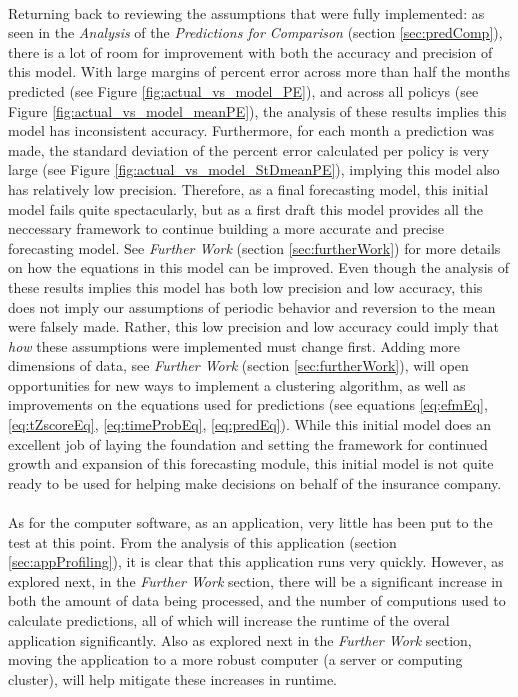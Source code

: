 \documentclass[12pt,letterpaper,titlepage]{article}
\begin{document}
		\paragraph*{}Returning back to reviewing the assumptions that were fully implemented: as seen in the \emph{Analysis} of the \emph{Predictions for Comparison} (section \ref{sec:predComp}), there is a lot of room for improvement with both the accuracy and precision of this model. With large margins of percent error across more than half the months predicted (see Figure \ref{fig:actual_vs_model_PE}), and across all policys (see Figure \ref{fig:actual_vs_model_meanPE}), the analysis of these results implies this model has inconsistent accuracy. Furthermore, for each month a prediction was made, the standard deviation of the percent error calculated per policy is very large (see Figure \ref{fig:actual_vs_model_StDmeanPE}), implying this model also has relatively low precision. Therefore, as a final forecasting model, this initial model fails quite spectacularly, but as a first draft this model provides all the neccessary framework to continue building a more accurate and precise forecasting model. See \emph{Further Work} (section \ref{sec:furtherWork}) for more details on how the equations in this model can be improved. Even though the analysis of these results implies this model has both low precision and low accuracy, this does not imply our assumptions of periodic behavior and reversion to the mean were falsely made. Rather, this low precision and low accuracy could imply that \emph{how} these assumptions were implemented must change first. Adding more dimensions of data, see \emph{Further Work} (section \ref{sec:furtherWork}), will open opportunities for new ways to implement a clustering algorithm, as well as improvements on the equations used for predictions (see equations \ref{eq:efmEq}, \ref{eq:tZscoreEq}, \ref{eq:timeProbEq}, \ref{eq:predEq}). While this initial model does an excellent job of laying the foundation and setting the framework for continued growth and expansion of this forecasting module, this initial model is not quite ready to be used for helping make decisions on behalf of the insurance company.
		\paragraph*{}As for the computer software, as an application, very little has been put to the test at this point. From the analysis of this application (section \ref{sec:appProfiling}), it is clear that this application runs very quickly. However, as explored next, in the \emph{Further Work} section, there will be a significant increase in both the amount of data being processed, and the number of computions used to calculate predictions, all of which will increase the runtime of the overal application significantly. Also as explored next in the \emph{Further Work} section, moving the application to a more robust computer (a server or computing cluster), will help mitigate these increases in runtime.		
\end{document}
